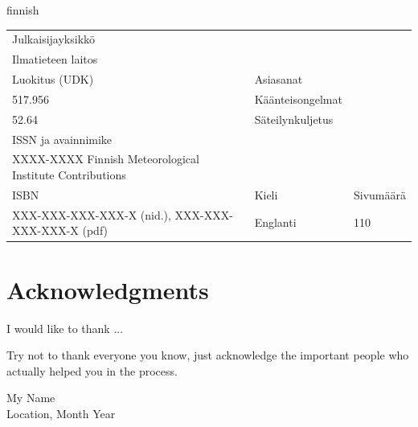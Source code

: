 \documentclass[11pt,b5paper]{book}
\newenvironment{changemargin}[3]{%
\begin{list}{}{
\setlength{\topsep}{0pt}
\setlength{\leftmargin}{#1}
\setlength{\rightmargin}{#2}
\setlength{\listparindent}{\parindent}
\setlength{\itemindent}{\parindent}
\setlength{\parsep}{\parskip}
}
\item[]}{\end{list}}
\begin{document}
\begin{changemargin}{-5mm}{-9mm}
\selectlanguage{finnish}
\footnotesize
\noindent{}
\lipsum[1-4]
\begin{flushleft}
\begin{tabular}{p{9cm} p{3cm} p{1.3cm}}
  \hline
  {\scriptsize Julkaisijayksikkö} & & \\
  Ilmatieteen laitos & & \\
  \hline
  {\scriptsize Luokitus (UDK)} & {\scriptsize Asiasanat} & \\
  517.956 & Käänteisongelmat & \\
  52.64 & Säteilynkuljetus & \\
  \hline
  {\scriptsize ISSN ja avainnimike} & & \\
  XXXX-XXXX Finnish Meteorological Institute Contributions &  & \\
  \hline
  {\scriptsize ISBN} & Kieli & Sivumäärä\\
  XXX-XXX-XXX-XXX-X (nid.), XXX-XXX-XXX-XXX-X (pdf)  & Englanti & 110 \\
  \hline
\end{tabular}
\end{flushleft}

\end{changemargin}





\thispagestyle{empty}
\normalsize
\newpage

\thispagestyle{empty}
\vspace*{2cm}

\section*{Acknowledgments}
\vspace*{0.5cm}

\noindent{}I would like to thank ...

Try not to thank everyone you know, just acknowledge the important people who
actually helped you in the process.

\vspace{2cm}

\noindent{}My Name \\
\noindent{}Location, Month Year 




\newpage
\clearpage

\thispagestyle{empty}

\vspace*{2cm}
\end{document}
